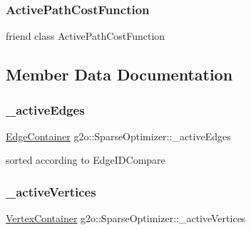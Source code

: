 \subsubsection{\texorpdfstring{Active\+Path\+Cost\+Function}{ActivePathCostFunction}}
{\footnotesize\ttfamily friend class Active\+Path\+Cost\+Function\hspace{0.3cm}{\ttfamily [friend]}}



\subsection{Member Data Documentation}
\mbox{\label{classg2o_1_1_sparse_optimizer_a3207df163943bc1672fc7872964a6d6c}} 
\subsubsection{\texorpdfstring{\+\_\+active\+Edges}{\_activeEdges}}
{\footnotesize\ttfamily \mbox{\hyperlink{structg2o_1_1_optimizable_graph_a2b43e807ae6d61ef8749ca1ef7c25f62}{Edge\+Container}} g2o\+::\+Sparse\+Optimizer\+::\+\_\+active\+Edges\hspace{0.3cm}{\ttfamily [protected]}}



sorted according to Edge\+I\+D\+Compare 

\mbox{\label{classg2o_1_1_sparse_optimizer_a805e1db97802980fa4dfef95cfa5e63e}} 
\subsubsection{\texorpdfstring{\+\_\+active\+Vertices}{\_activeVertices}}
{\footnotesize\ttfamily \mbox{\hyperlink{structg2o_1_1_optimizable_graph_a54f01b9b6071e65e6abeebe4afb29dec}{Vertex\+Container}} g2o\+::\+Sparse\+Optimizer\+::\+\_\+active\+Vertices\hspace{0.3cm}{\ttfamily [protected]}}



